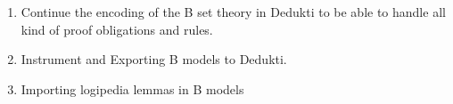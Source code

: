 





\begin{enumerate}

  \item Continue the encoding of the B set theory in Dedukti to be
  able to handle all kind of proof obligations and rules.


  \item Instrument and Exporting B models to Dedukti.

  \item Importing logipedia lemmas in B models

\end{enumerate}
